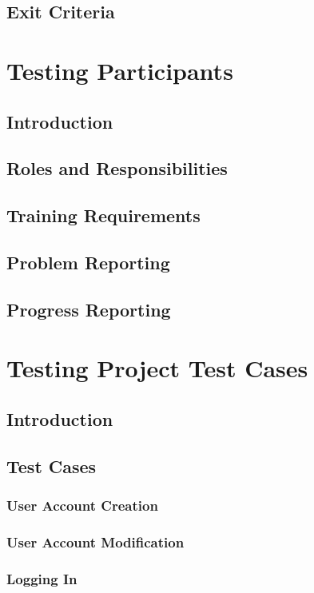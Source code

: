 \documentclass{article}
\begin{document}
\subsection{Exit Criteria}

\section{Testing Participants} %


\subsection{Introduction}
\subsection{Roles and Responsibilities}
\subsection{Training Requirements}
\subsection{Problem Reporting}
\subsection{Progress Reporting}

\section{Testing Project Test Cases}

\subsection{Introduction} %
\subsection{Test Cases}
\subsubsection{User Account Creation} %
\subsubsection{User Account Modification} %
\subsubsection{Logging In} %
\end{document}
